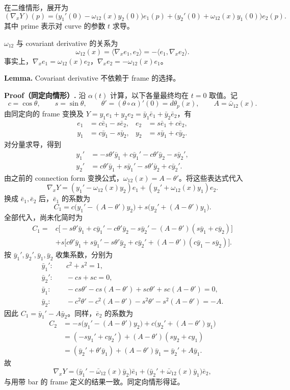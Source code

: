 \documentclass[UTF8,11pt,a4paper]{ctexart}
\begin{document}
在二维情形，展开为
\[
(\nabla_xY)(p)=\bigl(y_1'(0)-\omega_{12}(x)y_2(0)\bigr)e_1(p)+\bigl(y_2'(0)+\omega_{12}(x)y_1(0)\bigr)e_2(p).
\]
其中 prime 表示对 curve 的参数 $t$ 求导。

\par\noindent

$\omega_{12}$ 与 covariant derivative 的关系为
\[
\omega_{12}(x)
=\langle\nabla_xe_1,e_2\rangle
=-\langle e_1,\nabla_xe_2\rangle.
\]
事实上，$\nabla_xe_1=\omega_{12}(x)e_2$，$\nabla_xe_2=-\omega_{12}(x)e_1$。

\par\noindent\textbf{Lemma.} Covariant derivative 不依赖于 frame 的选择。

\textbf{Proof（同定向情形）.} 沿 $\alpha(t)$ 计算，以下各量最终均在 $t=0$ 取值。记
\[
c=\cos\theta,\qquad s=\sin\theta,\qquad
\theta'=(\theta\circ\alpha)'(0)=d\theta_p(x),\qquad
A=\bar\omega_{12}(x).
\]
由同定向的 frame 变换及 $Y=y_1e_1+y_2e_2=\bar y_1\bar e_1+\bar y_2\bar e_2$，有
\[
\begin{aligned}
e_1&=c\bar e_1-s\bar e_2,& e_2&=s\bar e_1+c\bar e_2,\\
y_1&=c\bar y_1-s\bar y_2,& y_2&=s\bar y_1+c\bar y_2.
\end{aligned}
\]
对分量求导，得到
\begin{align*}
y_1'&=-s\theta'\bar y_1+c\bar y_1'-c\theta'\bar y_2-s\bar y_2',\\
y_2'&=c\theta'\bar y_1+s\bar y_1'-s\theta'\bar y_2+c\bar y_2'.
\end{align*}
由之前的 connection form 变换公式，$\omega_{12}(x)=A-\theta'$。将这些表达式代入
\[
\nabla_xY=(y_1'-\omega_{12}(x)y_2)e_1
+(y_2'+\omega_{12}(x)y_1)e_2.
\]
换成 $\bar e_1,\bar e_2$ 后，$\bar e_1$ 的系数为
\[
C_1=c\bigl(y_1'-(A-\theta')y_2\bigr)
+s\bigl(y_2'+(A-\theta')y_1\bigr).
\]
全部代入，尚未化简时为
\begin{align*}
C_1={}&c\bigl[-s\theta'\bar y_1+c\bar y_1'
-c\theta'\bar y_2-s\bar y_2'
-(A-\theta')(s\bar y_1+c\bar y_2)\bigr]\\
&+s\bigl[c\theta'\bar y_1+s\bar y_1'
-s\theta'\bar y_2+c\bar y_2'
+(A-\theta')(c\bar y_1-s\bar y_2)\bigr].
\end{align*}
按 $\bar y_1',\bar y_2',\bar y_1,\bar y_2$ 收集系数，分别为
\begin{align*}
\bar y_1':&\quad c^2+s^2=1,\\
\bar y_2':&\quad -cs+sc=0,\\
\bar y_1:&\quad -cs\theta'-cs(A-\theta')
+sc\theta'+sc(A-\theta')=0,\\
\bar y_2:&\quad -c^2\theta'-c^2(A-\theta')
-s^2\theta'-s^2(A-\theta')=-A.
\end{align*}
因此 $C_1=\bar y_1'-A\bar y_2$。同样，$\bar e_2$ 的系数为
\begin{align*}
C_2&=-s\bigl(y_1'-(A-\theta')y_2\bigr)
+c\bigl(y_2'+(A-\theta')y_1\bigr)\\
&=(-sy_1'+cy_2')+(A-\theta')(sy_2+cy_1)\\
&=(\bar y_2'+\theta'\bar y_1)+(A-\theta')\bar y_1
=\bar y_2'+A\bar y_1.
\end{align*}
故
\[
\nabla_xY
=\bigl(\bar y_1'-\bar\omega_{12}(x)\bar y_2\bigr)\bar e_1
+\bigl(\bar y_2'+\bar\omega_{12}(x)\bar y_1\bigr)\bar e_2,
\]
与用带 bar 的 frame 定义的结果一致。同定向情形得证。
\end{document}
